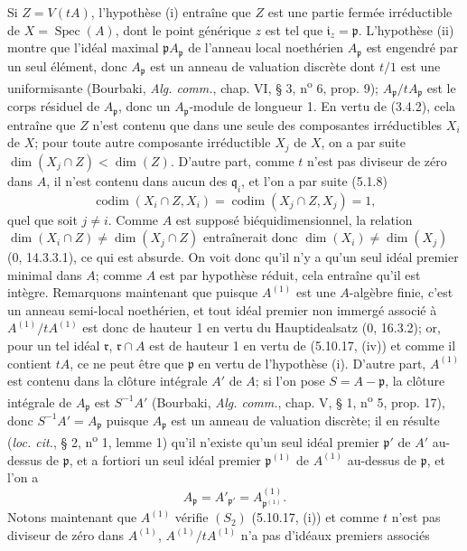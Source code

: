 \documentclass[10pt,oneside]{book}
\begin{document}
Si $Z=V(tA)$, l'hypothèse (i) entraîne que $Z$ est une partie fermée
irréductible de $X=\operatorname{Spec}(A)$, dont le point générique $z$ est tel
que $\mathfrak i_z=\mathfrak p$. L'hypothèse (ii) montre que l'idéal maximal
$\mathfrak pA_{\mathfrak p}$ de l'anneau local noethérien $A_{\mathfrak p}$
est engendré par un seul élément, donc $A_{\mathfrak p}$ est un anneau de
valuation discrète dont $t/1$ est une uniformisante (Bourbaki, \emph{Alg.
comm.}, chap. VI, § 3, n\textsuperscript{o} 6, prop. 9);
$A_{\mathfrak p}/tA_{\mathfrak p}$ est le corps résiduel de
$A_{\mathfrak p}$, donc un $A_{\mathfrak p}$-module de longueur 1. En vertu de
(3.4.2), cela entraîne que $Z$ n'est contenu que dans une seule des composantes
irréductibles $X_i$ de $X$; pour toute autre composante irréductible $X_j$ de
$X$, on a par suite $\dim(X_j\cap Z)<\dim(Z)$. D'autre part, comme $t$ n'est
pas diviseur de zéro dans $A$, il n'est contenu dans aucun des
$\mathfrak q_i$, et l'on a par suite (5.1.8)
\[
\operatorname{codim}(X_i\cap Z,X_i)
=\operatorname{codim}(X_j\cap Z,X_j)=1,
\]
quel que soit $j\neq i$. Comme $A$ est supposé biéquidimensionnel, la relation
$\dim(X_i\cap Z)\neq\dim(X_j\cap Z)$ entraînerait donc
$\dim(X_i)\neq\dim(X_j)$ (0, 14.3.3.1), ce qui est absurde. On voit donc qu'il
n'y a qu'un seul idéal premier minimal dans $A$; comme $A$ est par hypothèse
réduit, cela entraîne qu'il est intègre. Remarquons maintenant que puisque
$A^{(1)}$ est une $A$-algèbre finie, c'est un anneau semi-local noethérien, et
tout idéal premier non immergé associé à $A^{(1)}/tA^{(1)}$ est donc de
hauteur 1 en vertu du Hauptidealsatz (0, 16.3.2); or, pour un tel idéal
$\mathfrak r$, $\mathfrak r\cap A$ est de hauteur 1 en vertu de (5.10.17,
(iv)) et comme il contient $tA$, ce ne peut être que $\mathfrak p$ en vertu de
l'hypothèse (i). D'autre part, $A^{(1)}$ est contenu dans la clôture intégrale
$A'$ de $A$; si l'on pose $S=A-\mathfrak p$, la clôture intégrale de
$A_{\mathfrak p}$ est $S^{-1}A'$ (Bourbaki, \emph{Alg. comm.}, chap. V, § 1,
n\textsuperscript{o} 5, prop. 17), donc $S^{-1}A'=A_{\mathfrak p}$ puisque
$A_{\mathfrak p}$ est un anneau de valuation discrète; il en résulte
(\emph{loc. cit.}, § 2, n\textsuperscript{o} 1, lemme 1) qu'il n'existe qu'un
seul idéal premier $\mathfrak p'$ de $A'$ au-dessus de $\mathfrak p$, et a
fortiori un seul idéal premier $\mathfrak p^{(1)}$ de $A^{(1)}$ au-dessus de
$\mathfrak p$, et l'on a
\[
A_{\mathfrak p}=A'_{\mathfrak p'}
=A^{(1)}_{\mathfrak p^{(1)}}.
\]
Notons maintenant que $A^{(1)}$ vérifie $(S_2)$ (5.10.17, (i)) et comme $t$
n'est pas diviseur de zéro dans $A^{(1)}$, $A^{(1)}/tA^{(1)}$ n'a pas
d'idéaux premiers associés
\end{document}
